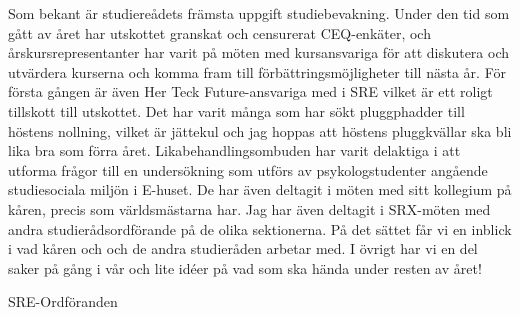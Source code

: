 \documentclass[../_main/handlingar.tex]{subfiles}
\begin{document}

Som bekant är studiereådets främsta uppgift studiebevakning. Under den tid som gått av året har utskottet granskat och censurerat CEQ-enkäter, och årskursrepresentanter har varit på möten med kursansvariga för att diskutera och utvärdera kurserna och komma fram till förbättringsmöjligheter till nästa år. För första gången är även Her Teck Future-ansvariga med i SRE vilket är ett roligt tillskott till utskottet. 
Det har varit många som har sökt pluggphadder till höstens nollning, vilket är jättekul och jag hoppas att höstens pluggkvällar ska bli lika bra som förra året. 
Likabehandlingsombuden har varit delaktiga i att utforma frågor till en undersökning som utförs av psykologstudenter angående studiesociala miljön i E-huset. De har även deltagit i möten med sitt kollegium på kåren, precis som världsmästarna har. 
Jag har även deltagit i SRX-möten med andra studierådsordförande på de olika sektionerna. På det sättet får vi en inblick i vad kåren och och de andra studieråden arbetar med. I övrigt har vi en del saker på gång i vår och lite idéer på vad som ska hända under resten av året!


\begin{signatures}{1}
    \mvh
    \signature{\sreordf}{SRE-Ordföranden}
\end{signatures}
\end{document}
